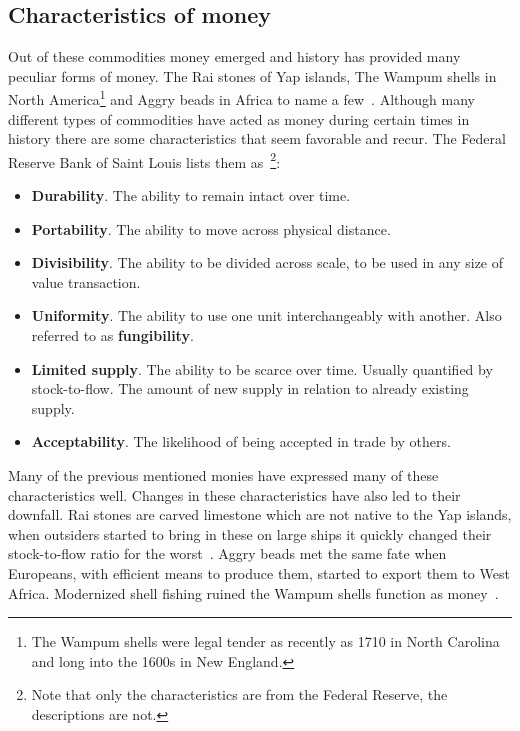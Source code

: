 \subsection{Characteristics of money}
	\label{sec:characteristics:money}

Out of these commodities money emerged and history has provided many peculiar forms of money. The Rai stones of Yap islands, The Wampum shells in North America\footnote{The Wampum shells were legal tender as recently as 1710 in North Carolina and long into the 1600s in New England.} and Aggry beads in Africa to name a few~\cite{szabo:shelling:out}. Although many different types of commodities have acted as money during certain times in history there are some characteristics that seem favorable and recur. The Federal Reserve Bank of Saint Louis lists them as~\cite{fed:function:money}\footnote{Note that only the characteristics are from the Federal Reserve, the descriptions are not.}:

\begin{itemize}
	\item \textbf{Durability}. The ability to remain intact over time.
	
	\item \textbf{Portability}. The ability to move across physical distance.
	
	\item \textbf{Divisibility}. The ability to be divided across scale, to be used in any size of value transaction.
	
	\item \textbf{Uniformity}. The ability to use one unit interchangeably with another. Also referred to as \textbf{fungibility}.
	
	\item \textbf{Limited supply}. The ability to be scarce over time. Usually quantified by stock-to-flow. The amount of new supply in relation to already existing supply.
	
	\item \textbf{Acceptability}. The likelihood of being accepted in trade by others.
\end{itemize}

Many of the previous mentioned monies have expressed many of these characteristics well. Changes in these characteristics have also led to their downfall. Rai stones are carved limestone which are not native to the Yap islands, when outsiders started to bring in these on large ships it quickly changed their stock-to-flow ratio for the worst~\cite{ammous:bitcoin:standard}. Aggry beads met the same fate when Europeans, with efficient means to produce them, started to export them to West Africa. Modernized shell fishing ruined the Wampum shells function as money~\cite{szabo:shelling:out}.

